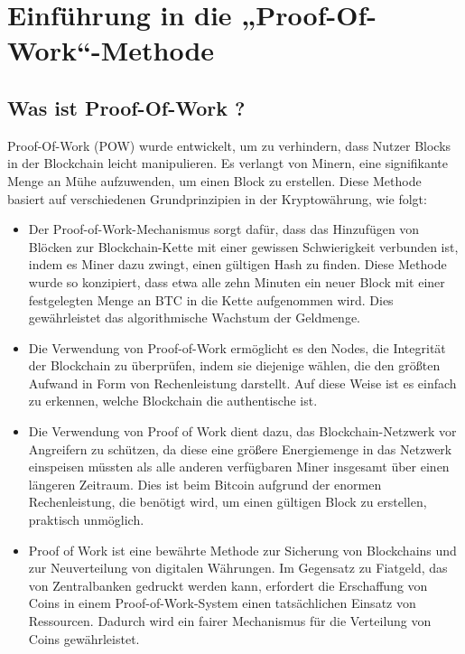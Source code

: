 \documentclass[ngerman]{scrreprt}
\begin{document}
\chapter[Theoretische Seite der Proof-Of-Work-Methode]{Einführung in die „Proof-Of-Work“-Methode}	

\section{Was ist Proof-Of-Work ?}
Proof-Of-Work (POW) wurde entwickelt, um zu verhindern, dass Nutzer Blocks in der Blockchain leicht manipulieren. Es verlangt von Minern, eine signifikante Menge an Mühe aufzuwenden, um einen Block zu erstellen. Diese Methode basiert auf verschiedenen Grundprinzipien in der Kryptowährung, wie folgt:

\begin{itemize}
	\item{Der Proof-of-Work-Mechanismus sorgt dafür, dass das Hinzufügen von Blöcken zur Blockchain-Kette mit einer gewissen Schwierigkeit verbunden ist, indem es Miner dazu zwingt, einen gültigen Hash zu finden. Diese Methode wurde so konzipiert, dass etwa alle zehn Minuten ein neuer Block mit einer festgelegten Menge an BTC in die Kette aufgenommen wird. Dies gewährleistet das algorithmische Wachstum der Geldmenge.}
	\item{Die Verwendung von Proof-of-Work ermöglicht es den Nodes, die Integrität der Blockchain zu überprüfen, indem sie diejenige wählen, die den größten Aufwand in Form von Rechenleistung darstellt. Auf diese Weise ist es einfach zu erkennen, welche Blockchain die authentische ist.}
	\item{Die Verwendung von Proof of Work dient dazu, das Blockchain-Netzwerk vor Angreifern zu schützen, da diese eine größere Energiemenge in das Netzwerk einspeisen müssten als alle anderen verfügbaren Miner insgesamt über einen längeren Zeitraum. Dies ist beim Bitcoin aufgrund der enormen Rechenleistung, die benötigt wird, um einen gültigen Block zu erstellen, praktisch unmöglich.}
	\item{Proof of Work ist eine bewährte Methode zur Sicherung von Blockchains und zur Neuverteilung von digitalen Währungen. Im Gegensatz zu Fiatgeld, das von Zentralbanken gedruckt werden kann, erfordert die Erschaffung von Coins in einem Proof-of-Work-System einen tatsächlichen Einsatz von Ressourcen. Dadurch wird ein fairer Mechanismus für die Verteilung von Coins gewährleistet.}
\end{itemize}
\end{document}
